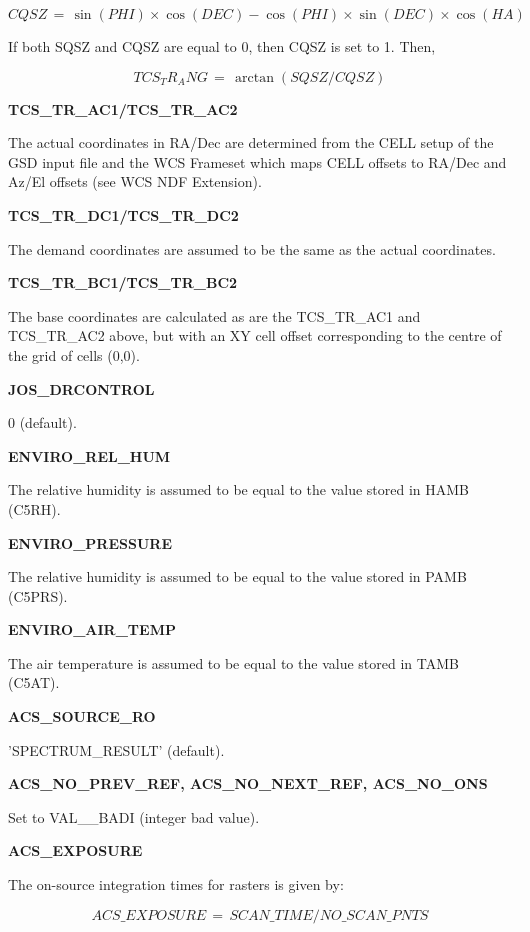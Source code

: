 \documentclass[twoside,11pt,nolof]{starlink}
\providecommand{\tamb}{TAMB (C5AT)}
\providecommand{\pamb}{PAMB (C5PRS)}
\providecommand{\hamb}{HAMB (C5RH)}
\begin{document}
\begin{equation}
CQSZ \,=\, \sin(PHI)\times\cos(DEC) - \cos(PHI)\times\sin(DEC)\times\cos(HA)
\end{equation}

If both SQSZ and CQSZ are equal to 0, then CQSZ is set to 1.  Then,

\begin{equation}
TCS _ TR _ ANG \,=\, \arctan(SQSZ/CQSZ)
\end{equation}

\textbf{TCS\_TR\_AC1/TCS\_TR\_AC2}

The actual coordinates in RA/Dec are determined from the CELL setup of the GSD input file and the WCS Frameset which maps CELL offsets to RA/Dec and Az/El offsets (see WCS NDF Extension).

\textbf{TCS\_TR\_DC1/TCS\_TR\_DC2}

The demand coordinates are assumed to be the same as the actual coordinates.

\textbf{TCS\_TR\_BC1/TCS\_TR\_BC2}

The base coordinates are calculated as are the TCS\_TR\_AC1 and TCS\_TR\_AC2 above, but with an XY cell offset corresponding to the centre of the grid of cells (0,0).

\textbf{JOS\_DRCONTROL}

0 (default).

\textbf{ENVIRO\_REL\_HUM}

The relative humidity is assumed to be equal to the value stored in \hamb.

\textbf{ENVIRO\_PRESSURE}

The relative humidity is assumed to be equal to the value stored in \pamb.

\textbf{ENVIRO\_AIR\_TEMP}

The air temperature is assumed to be equal to the value stored in \tamb.

\textbf{ACS\_SOURCE\_RO}

'SPECTRUM\_RESULT' (default).

\textbf{ACS\_NO\_PREV\_REF, ACS\_NO\_NEXT\_REF, ACS\_NO\_ONS}

Set to VAL\_\_BADI (integer bad value).

\textbf{ACS\_EXPOSURE}

The on-source integration times for rasters is given by:

\begin{equation}
ACS\_EXPOSURE \,=\, SCAN\_TIME / NO\_SCAN\_PNTS
\end{equation}
\end{document}
